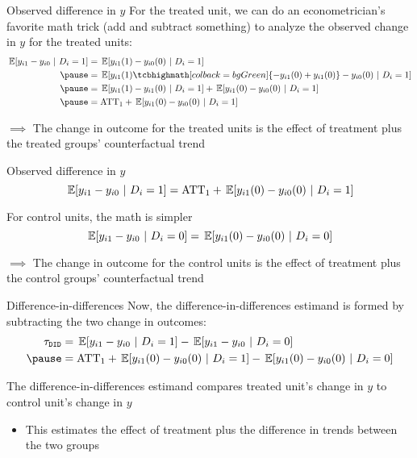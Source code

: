 \documentclass[aspectratio=169,t,11pt,table]{beamer}
\begin{document}
\begin{frame}{Observed difference in $y$}
  For the treated unit, we can do an econometrician's favorite math trick (add and subtract something) to analyze the observed change in $y$ for the treated units:
  \begin{align*}
    \expec{y_{i1} - y_{i0}}{D_i = 1} 
    &= \expec{y_{i1}(1) - y_{i0}(0)}{D_i = 1} \\
    \pause
    &= \expec{y_{i1}(1) \tcbhighmath[colback = bgGreen]{- y_{i1}(0) + y_{i1}(0)} - y_{i0}(0)}{D_i = 1} \\
    \pause
    &= \expec{y_{i1}(1) - y_{i1}(0)}{D_i = 1} + \expec{y_{i1}(0) - y_{i0}(0)}{D_i = 1} \\
    \pause
    &= \text{ATT}_1 + \expec{y_{i1}(0) - y_{i0}(0)}{D_i = 1}
  \end{align*}

  \medskip 
  $\implies$ The change in outcome for the treated units is the effect of treatment plus the treated groups' counterfactual trend
\end{frame}

\begin{frame}{Observed difference in $y$}
  \vspace*{-\bigskipamount}
  $$
    \expec{y_{i1} - y_{i0}}{D_i = 1} = \text{ATT}_1 + \expec{y_{i1}(0) - y_{i0}(0)}{D_i = 1}
  $$

  \bigskip\bigskip
  For control units, the math is simpler 
  $$
    \expec{y_{i1} - y_{i0}}{D_i = 0} = \expec{y_{i1}(0) - y_{i0}(0)}{D_i = 0}
  $$

  \medskip
  $\implies$ The change in outcome for the control units is the effect of treatment plus the control groups' counterfactual trend 
\end{frame}

\begin{frame}{Difference-in-differences}
  Now, the difference-in-differences estimand is formed by subtracting the two change in outcomes:
  \begin{align*}
    \tau_{\texttt{DID}} &= \expec{y_{i1} - y_{i0}}{D_i = 1} - \expec{y_{i1} - y_{i0}}{D_i = 0}  \\ 
    \pause
    &= \text{ATT}_1 + \expec{y_{i1}(0) - y_{i0}(0)}{D_i = 1} - \expec{y_{i1}(0) - y_{i0}(0)}{D_i = 0}
  \end{align*}

  \bigskip
  The difference-in-differences estimand compares treated unit's change in $y$ to control unit's change in $y$
  \begin{itemize}
    \item This estimates the effect of treatment plus the difference in trends between the two groups
  \end{itemize}
\end{frame}
\end{document}
